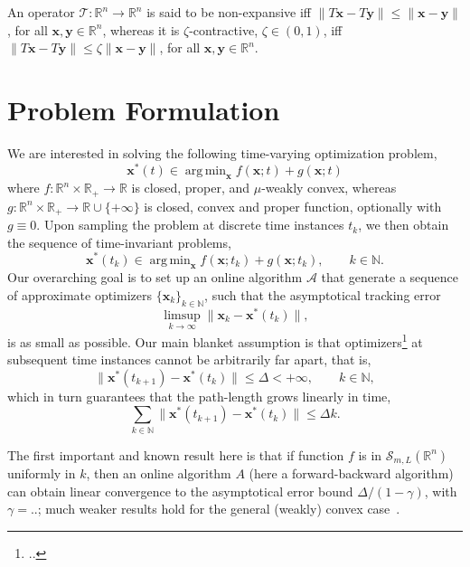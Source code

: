 \documentclass{article}
\DeclareMathOperator*{\argmin}{arg\,min}
\newcommand{\N}{\mathbb{N}}
\newcommand{\R}{\mathbb{R}}
\newcommand{\x}{\mathbold{x}}
\newcommand{\y}{\mathbold{y}}
\newcommand{\T}{\mathcal{T}}
\begin{document}
An operator $\T: \R^n \to \R^n$ is said to be non-expansive iff $\|T \x - T \y \| \leq \|\x- \y\|$, for all $\x, \y \in \R^n$, whereas it is $\zeta$-contractive, $\zeta\in(0,1)$, iff $\|T \x - T \y \| \leq \zeta \|\x- \y\|$, for all $\x, \y \in \R^n$.


\section{Problem Formulation}

We are interested in solving the following time-varying optimization problem,
\begin{equation}\label{eq:continuous-time-problem}
	\x^*(t) \in \argmin_{\x} f(\x; t) + g(\x; t)
\end{equation}
where $f : \R^n \times \R_+ \to \R$ is closed, proper, and $\mu$-weakly convex, whereas $g : \R^n \times \R_+ \to \R \cup \{ +\infty \}$ is closed, convex and proper function, optionally with $g \equiv 0$. Upon sampling the problem at discrete time instances $t_k$, we then obtain the sequence of time-invariant problems,
\begin{equation}\label{eq:base-problem}
	\x^*(t_k) \in \argmin_{\x} f(\x; t_k) + g(\x; t_k), \qquad k \in \N. 
\end{equation}
Our overarching goal is to set up an online algorithm $\mathcal{A}$ that generate a sequence of approximate optimizers $\{\x_k\}_{k\in \N}$, such that the asymptotical tracking error 
\begin{equation}
\limsup_{k \to \infty} \|\x_k - \x^*(t_k)\|,
\end{equation}
is as small as possible. Our main blanket assumption is that optimizers\footnote{..} at subsequent time instances cannot be arbitrarily far apart, that is, 
\begin{equation}
\|\x^*(t_{k+1}) - \x^*(t_k)\| \leq \Delta < +\infty, \qquad k \in \N,
\end{equation}
which in turn guarantees that the path-length grows linearly in time, 
\begin{equation}
\sum_{k\in \N} \|\x^*(t_{k+1}) - \x^*(t_k)\| \leq \Delta k.
\end{equation}

The first important and known result here is that if function $f$ is in $\mathcal{S}_{m,L}(\R^n)$ uniformly in $k$, then an online algorithm $A$ (here a forward-backward algorithm) can obtain linear convergence to the asymptotical error bound $\Delta/(1-\gamma)$, with $\gamma = ..$; much weaker results hold for the general (weakly) convex case~\cite{.}.
\end{document}

